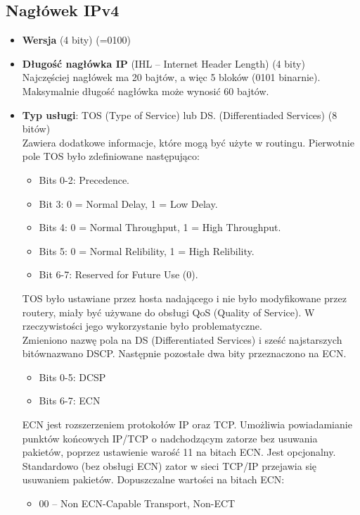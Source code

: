 \documentclass[a4paper]{article}
\begin{document}
\subsection{Nagłówek IPv4}
\begin{itemize}
    \item \textbf{Wersja} (4 bity) (=0100)
    \item \textbf{Długość nagłówka IP} (IHL – Internet Header Length) (4 bity)\\
    Najczęściej nagłówek ma 20 bajtów, a więc 5 bloków (0101 binarnie). Maksymalnie długość nagłówka może wynosić 60 bajtów.
    \item \textbf{Typ usługi}: TOS (Type of Service) lub DS. (Differentiaded Services) (8 bitów)\\
    Zawiera dodatkowe informacje, które mogą być użyte w routingu. Pierwotnie pole TOS było zdefiniowane następująco:
    \begin{itemize}
        \item Bits 0-2: Precedence.
        \item Bit 3: 0 = Normal Delay, 1 = Low Delay.
        \item Bits 4: 0 = Normal Throughput, 1 = High Throughput.
        \item Bits 5: 0 = Normal Relibility, 1 = High Relibility.
        \item Bit 6-7: Reserved for Future Use (0).
    \end{itemize}
    TOS było ustawiane przez hosta nadającego i nie było modyfikowane przez routery, miały być używane do obsługi QoS (Quality of Service). W rzeczywistości jego wykorzystanie było problematyczne.\\
    Zmieniono nazwę pola na DS (Differentiated Services) i sześć najstarszych bitównazwano DSCP. Następnie pozostałe dwa bity przeznaczono na ECN.
    \begin{itemize}
        \item Bits 0-5: DCSP
        \item Bits 6-7: ECN
    \end{itemize}
    ECN jest rozszerzeniem protokołów IP oraz TCP. Umożliwia powiadamianie punktów końcowych IP/TCP o nadchodzącym zatorze bez usuwania pakietów, poprzez ustawienie warość 11 na bitach ECN. Jest opcjonalny.\\
    Standardowo (bez obsługi ECN) zator w sieci TCP/IP przejawia się usuwaniem pakietów.
    Dopuszczalne wartości na bitach ECN:
    \begin{itemize}
        \item 00 – Non ECN-Capable Transport, Non-ECT

\end{itemize}
\end{itemize}
\end{document}
